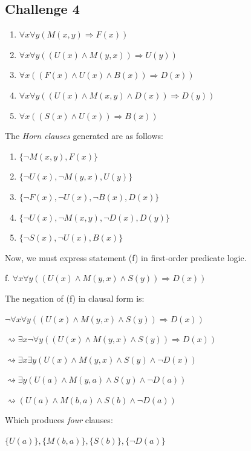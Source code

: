 \documentclass[12pt]{article}
\newcommand{\impl}{\mathbin{\Rightarrow}}
\begin{document}
\subsection*{Challenge 4}
\begin{enumerate}
  \item $\forall x \forall y(M(x,y) \impl F(x))$
  \item $\forall x \forall y((U(x) \land M(y,x)) \impl U(y))$
  \item $\forall x((F(x) \land U(x) \land B(x)) \impl D(x))$
  \item $\forall x \forall y((U(x) \land M(x,y) \land D(x)) \impl D(y))$
  \item $\forall x((S(x) \land U(x)) \impl B(x))$
\end{enumerate}

\bigskip
\noindent
The \emph{Horn clauses} generated are as follows:
\begin{enumerate}
  \item $\{\neg M(x,y), F(x)\}$
  \item $\{\neg U(x), \neg M(y,x), U(y)\}$
  \item $\{\neg F(x), \neg U(x), \neg B(x), D(x)\}$
  \item $\{\neg U(x), \neg M(x,y), \neg D(x), D(y)\}$
  \item $\{\neg S(x), \neg U(x), B(x)\}$
\end{enumerate}

\bigskip
\noindent
Now, we must express statement (f) in first-order predicate logic.

\bigskip
f.  $\forall x \forall y((U(x) \land M(y,x) \land S(y)) \impl D(x))$

\bigskip
\noindent
The negation of (f) in clausal form is: 

$\neg \forall x \forall y((U(x) \land M(y,x) \land S(y)) \impl D(x))$

$\rightsquigarrow \exists x \neg \forall y((U(x) \land M(y,x) \land S(y)) \impl D(x))$

$\rightsquigarrow \exists x \exists y(U(x) \land M(y,x) \land S(y) \land \neg D(x))$

$\rightsquigarrow \exists y(U(a) \land M(y,a) \land S(y) \land \neg D(a))$

$\rightsquigarrow (U(a) \land M(b,a) \land S(b) \land \neg D(a))$

\bigskip
\noindent
Which produces \emph{four} clauses: 

$\{U(a)\}, \{M(b,a)\}, \{S(b)\}, \{\neg D(a)\}$
\end{document}
